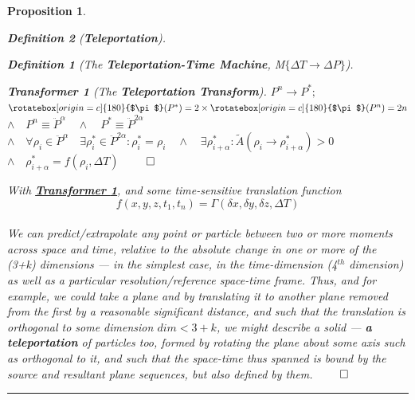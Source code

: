 \documentclass[a4paper, 18pt]{book} %
\newtheorem{defn}{Definition}
\newtheorem{prop}{Proposition}
\newtheorem{transf}{Transformer}
\newcommand{\invpi}{\rotatebox[origin=c]{180}{$\pi$}}
\begin{document}
\begin{appendices}
\begin{prop}
\begin{defn}[\textbf{Teleportation}]
\begin{defn}[The \textbf{Teleportation-Time Machine}, M$\{\Delta T \rightarrow \Delta P\}$]
\begin{transf}[The \textbf{Teleportation Transform}]
\label{TRANSFTELEP}
$P^{n} \rightarrow P^* ;$\\
$\invpi(P^*) = 2 \times \invpi(P^{n}) = 2n$\\
$\land \quad P^n \equiv \ddot{P}^{\alpha} \quad \land \quad P^* \equiv \ddot{P}^{2\alpha}$\\
$\land \quad \forall \rho_i \in \ddot{P}^{\alpha} \quad \exists \rho^*_i \in \ddot{P}^{2\alpha} : \rho^*_i = \rho_i \quad \land \quad \exists \rho^*_{i+\alpha} : \tilde{A}(\rho_i \rightarrow \rho^*_{i+\alpha}) > 0$\\
$\land \quad \rho^*_{i+\alpha} = f(\rho_i,\Delta T)$
$\qed$\\
\end{transf}
\end{defn}

\end{defn}

With \textbf{\hyperref[TRANSFTELEP]{Transformer \ref{TRANSFTELEP}}}, and some time-sensitive translation function\\ 

\begin{equation}
f({x,y,z,t_1,t_n}) = \Gamma(\delta x,\delta y,\delta z,\Delta T)
\end{equation}\\

We can predict/extrapolate any point or particle between two or more moments across space and time, relative to the absolute change in one or more of the (3+k) dimensions --- in the simplest case, in the time-dimension (4$^{th}$ dimension) as well as a particular resolution/reference space-time frame. Thus, and for example, we could take a plane and by translating it to another plane removed from the first by a reasonable significant distance, and such that the translation is orthogonal to some dimension $dim < 3 + k$, we might describe a solid --- \textbf{a teleportation} of particles too, formed by rotating the plane about some axis such as orthogonal to it, and such that the space-time thus spanned is bound by the source and resultant plane sequences, but also defined by them.
$\qed$
\end{prop}

\noindent\rule{\textwidth}{0.4pt}


\end{appendices}
\end{document}
